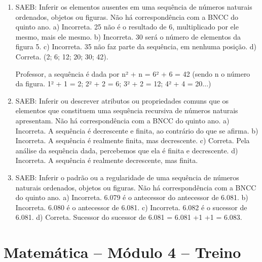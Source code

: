 \begin{enumerate}
\item
SAEB: Inferir os elementos ausentes em uma sequência de números naturais ordenados, objetos ou figuras.
Não há correspondência com a BNCC do quinto ano.
a) Incorreta. 25 não é o resultado de 6, multiplicado por ele mesmo, mais ele mesmo.
b) Incorreta. 30 será o número de elementos da figura 5.
c) Incorreta. 35 não faz parte da sequência, em nenhuma posição.
d) Correta. (2; 6; 12; 20; 30; 42).

Professor, a sequência é dada por n² + n =
6² + 6 = 42 (sendo n o número da figura. 1² + 1 = 2; 2² + 2 = 6; 3² + 2 = 12; 4² + 4 = 20...)

\item
SAEB: Inferir ou descrever atributos ou propriedades comuns que os elementos que constituem uma sequência recursiva de números naturais apresentam.
Não há correspondência com a BNCC do quinto ano.
a) Incorreta. A sequência é decrescente e finita, ao contrário do que se afirma.
b) Incorreta. A sequência é realmente finita, mas decrescente.
c) Correta. Pela análise da sequência dada, percebemos que ela é finita e
decrescente.
d) Incorreta. A sequência é realmente decrescente, mas finita.

\item
SAEB: Inferir o padrão ou a regularidade de uma sequência de números naturais ordenados, objetos ou figuras.
Não há correspondência com a BNCC do quinto ano.
a) Incorreta. 6.079 é o antecessor do antecessor de 6.081.
b) Incorreta. 6.080 é o antecessor de 6.081.
c) Incorreta. 6.082 é o sucessor de 6.081.
d) Correta. Sucessor do sucessor de 6.081 = 6.081 +1 +1 = 6.083.
\end{enumerate}


\section*{Matemática -- Módulo 4 -- Treino}

